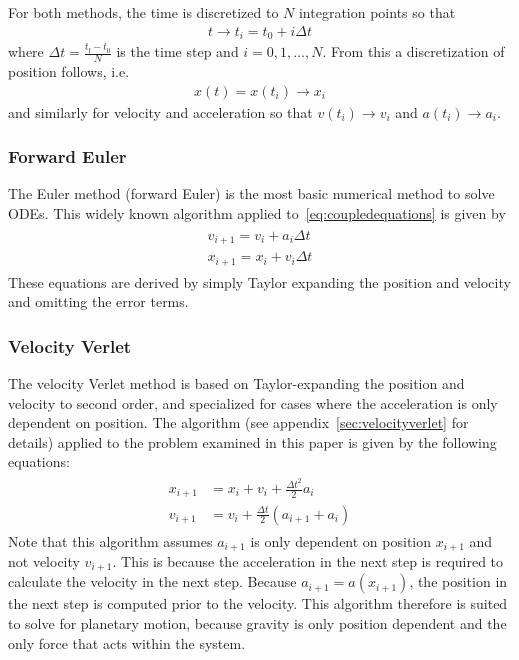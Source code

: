\documentclass[aps,reprint]{revtex4-1}
\begin{document}
For both methods, the time is discretized to $N$ integration points so that
\begin{align*}
  t \rightarrow t_i = t_0 + i \Delta{t}
\end{align*}
where $\Delta{t} = \frac{t_\text{f} - t_0}{N}$ is the time step and $i = 0, 1, \hdots, N$.
From this a discretization of position follows, i.e.
\begin{align*}
  x(t) = x(t_i) \rightarrow x_i
\end{align*}
and similarly for velocity and acceleration so that $v(t_i) \rightarrow v_i$ and
$a(t_i) \rightarrow a_i$.

\subsubsection{Forward Euler}
The Euler method (forward Euler) is the most basic numerical method to solve
ODEs. This widely known algorithm applied to~\ref{eq:coupledequations} is given by
\begin{align*}
  \begin{split}
  v_{i+1} = v_{i} + a_{i}\Delta{t} \\
  x_{i+1} = x_{i} + v_{i}\Delta{t}
\end{split}
\end{align*}
These equations are derived by simply Taylor expanding the position and velocity
and omitting the error terms.
\subsubsection{Velocity Verlet}
The velocity Verlet method is based on Taylor-expanding the position and velocity
to second order, and specialized for cases where the acceleration is only
dependent on position. The algorithm (see appendix~\ref{sec:velocityverlet} for details)
applied to the problem examined in this paper is given by the following equations:
\begin{align}
  \begin{split}
    x_{i+1} &= x_i + v_i + \frac{\Delta{t}^2}{2} a_i \\
    v_{i+1} &= v_i + \frac{\Delta{t}}{2}(a_{i+1} + a_{i})
  \end{split}
\end{align}
Note that this algorithm assumes $a_{i+1}$ is only dependent on position $x_{i+1}$
and not velocity $v_{i+1}$. This is because the acceleration in the next step
is required to calculate the velocity in the next step. Because $a_{i+1} = a(x_{i+1})$,
the position in the next step is computed prior to the velocity. This algorithm
therefore is suited to solve for planetary motion, because gravity is only
position dependent and the only force that acts within the system.
\end{document}
